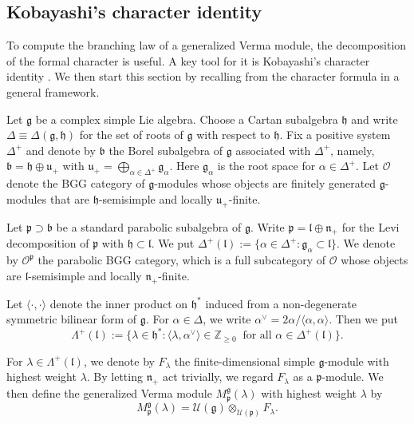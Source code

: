 \documentclass[reqno,11pt]{amsart}
\theoremstyle{remark}
\theoremstyle{definition}
\numberwithin{equation}{section}
\newcommand{\ga}{\alpha}
\newcommand{\gL}{\Lambda}
\newcommand{\gD}{\Delta}
\newcommand{\fb}{{\mathfrak b}}
\newcommand{\fg}{{\mathfrak g}}
\newcommand{\fh}{{\mathfrak h}}
\newcommand{\fl}{{\mathfrak l}}
\newcommand{\fn}{{\mathfrak n}}
\newcommand{\fp}{{\mathfrak p}}
\newcommand{\fu}{{\mathfrak u}}
\newcommand{\Z}{\mathbb{Z}}
\newcommand{\Cal}{\mathcal}
\newcommand{\IP}[2]{\langle#1 , #2\rangle}     %
\newcommand{\Mp}{M^{\fg}_{\fp}}
\begin{document}
\subsection{Kobayashi's character identity}
\label{sec:character}

To compute the branching law of a generalized Verma module,
the decomposition of the formal character is useful.
 A key tool for it is Kobayashi's character identity \cite{Kobayashi12}. 
We then start this section by recalling from \cite{Kobayashi12} 
the character formula in a general framework.

Let $\fg$ be a complex simple Lie algebra. Choose a Cartan subalgebra $\fh$ and 
write $\gD\equiv \gD(\fg, \fh)$ for the set of roots of $\fg$ with respect to $\fh$.
Fix a positive system $\gD^+$ and denote  by 
$\fb$ the Borel subalgebra of $\fg$ associated with $\gD^+$, namely,
$\fb = \fh \oplus \fu_+$ with $\fu_+=\bigoplus_{\ga \in \gD^+} \fg_\ga$. 
Here $\fg_\ga$ is the root space
for $\ga \in \gD^+$. Let $\Cal{O}$ denote the BGG category of $\fg$-modules
whose objects are finitely generated $\fg$-modules that are $\fh$-semisimple
and locally $\fu_+$-finite.

Let $\fp \supset \fb$ be a standard parabolic subalgebra of $\fg$. Write 
$\fp =\fl \oplus \fn_+$ for the Levi decomposition of $\fp$ with $\fh \subset \fl$. 
We put $\gD^+(\fl):=\{\ga \in \gD^+: \fg_\ga \subset \fl\}$. 
We denote by $\Cal{O}^\fp$ the parabolic BGG category, which is a full
subcategory of $\Cal{O}$ whose objects are $\fl$-semisimple and locally
$\fn_+$-finite.

Let $\IP{\cdot}{\cdot}$ denote the inner product on $\fh^*$ induced from 
a non-degenerate symmetric bilinear form 
of $\fg$. For $\ga \in \gD$, we write $\ga^\vee = 2\ga/\IP{\ga}{\ga}$.
Then we put
\begin{equation*}
\gL^+(\fl):=\{\lambda \in \fh^* : \IP{\lambda}{\ga^\vee} \in \Z_{\geq 0}
\;\;
\text{for all $\ga \in \gD^+(\fl)$\}}.
\end{equation*}

For $\lambda \in \gL^+(\fl)$, we denote by $F_\lambda$ the finite-dimensional
simple $\fg$-module with highest weight $\lambda$. By letting $\fn_+$ act trivially,
we regard $F_\lambda$ as a $\fp$-module. We then define the generalized Verma
module $\Mp(\lambda)$ with highest weight $\lambda$ by 
\begin{equation*}
\Mp(\lambda) =\Cal{U}(\fg)\otimes_{\Cal{U}(\fp)}F_{\lambda}.
\end{equation*}
\end{document}

